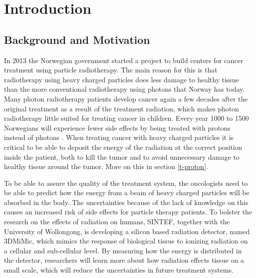 \documentclass[../main/thesis.tex]{subfiles}
\begin{document}
\newpage

\chapter{Introduction}
\label{intro}
\section{Background and Motivation}
\label{i-background}
In 2013 the Norwegian government started a project to build centers for cancer treatment using particle radiotherapy. The main reason for this is that radiotherapy using heavy charged particles does less damage to healthy tissue than the more conventional radiotherapy using photons that Norway has today. Many photon radiotherapy patients develop cancer again a few decades after the original treatment as a result of the treatment radiation, which makes photon radiotherapy little suited for treating cancer in children. Every year 1000 to 1500 Norwegians will experience fewer side effects by being treated with protons instead of photons \citep{uio2012}. When treating cancer with heavy charged particles it is critical to be able to deposit the energy of the radiation at the correct position inside the patient, both to kill the tumor and to avoid unnecessary damage to healthy tissue around the tumor. More on this in section \ref{t-proton}.


To be able to assure the quality of the treatment system, the oncologists need to be able to predict how the energy from a beam of heavy charged particles will be absorbed in the body. The uncertainties because of the lack of knowledge on this causes an increased risk of side effects for particle therapy patients. To bolster the research on the effects of radiation on humans, SINTEF, together with the University of Wollongong, is developing a silicon based radiation detector, named 3DMiMic, which mimics the response of biological tissue to ionizing radiation on a cellular and sub-cellular level. By measuring how the energy is distributed in the detector, researchers will learn more about how radiation effects tissue on a small scale, which will reduce the uncertainties in future treatment systems. \citep{sintef3dmimic}
\end{document}
